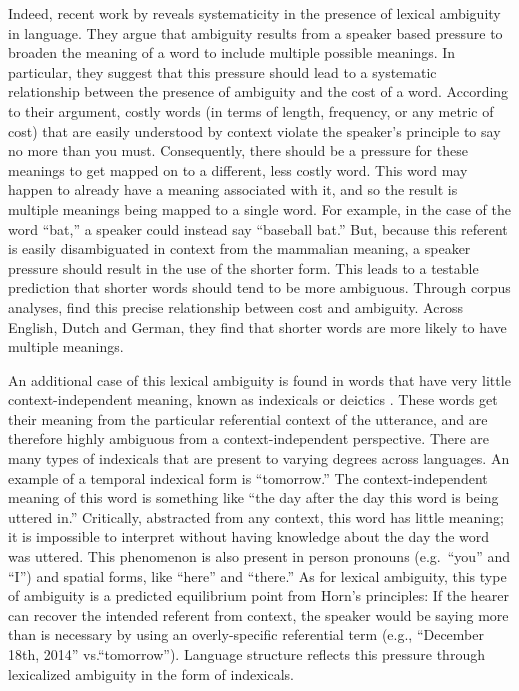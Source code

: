 \documentclass[man]{apa2}
\begin{document}
Indeed, recent work by  reveals systematicity in the presence of lexical ambiguity in language. They argue that ambiguity results from a speaker based pressure to broaden the meaning of a word to include multiple possible meanings. In particular, they suggest that this pressure should lead to a systematic relationship between the presence of ambiguity and the cost of a word. According to their argument, costly words (in terms of length, frequency, or any metric of cost) that are easily understood by context violate the speaker's principle to say no more than you must. Consequently, there should be a pressure for these meanings to get mapped on to a different, less costly word. This word may happen to already have a meaning associated with it, and so the result is multiple meanings being mapped to a single word. For example, in the case of the word ``bat,'' a speaker could instead say ``baseball bat.'' But, because this referent is easily disambiguated in context from the mammalian meaning, a speaker pressure should result in the use of the shorter form. This leads to a testable prediction that shorter words should tend to be more ambiguous. Through corpus analyses,  find this precise relationship between cost and ambiguity. Across English, Dutch and German, they find that shorter words are more likely to have multiple meanings. 

An additional case of this lexical ambiguity is found in words that have very little context-independent meaning, known as indexicals or deictics \cite{frawley2003international}. These words get their meaning from the particular referential context of the utterance, and are therefore highly ambiguous from a context-independent perspective. There are many types of indexicals that are present to varying degrees across languages. An example of a temporal indexical form is ``tomorrow.'' The context-independent meaning of this word is something like ``the day after the day this word is being uttered in.'' Critically, abstracted from any context, this word has little meaning; it is impossible to interpret without having knowledge about the day the word was uttered. This phenomenon is also present in person pronouns (e.g.\ ``you'' and ``I'') and spatial forms, like ``here'' and ``there.'' As for lexical ambiguity, this type of ambiguity is a predicted equilibrium point from Horn's principles: If the hearer can recover the intended referent from context, the speaker would be saying more than is necessary by using an overly-specific referential term (e.g., ``December 18th, 2014'' vs.``tomorrow''). Language structure reflects this pressure through lexicalized ambiguity in the form of indexicals.
\end{document}
